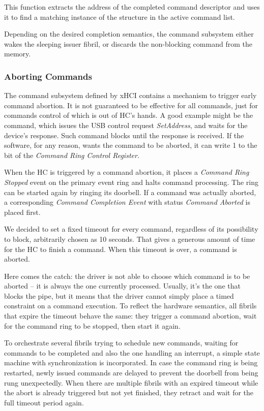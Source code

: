 This function extracts the address of the completed command descriptor and uses
it to find a matching instance of the  structure in the
active command list.

Depending on the desired completion semantics, the command subsystem either
wakes the sleeping issuer fibril, or discards the non-blocking command from the
memory.


\subsubsection{Aborting Commands}

The command subsystem defined by xHCI contains a mechanism to trigger early
command abortion. It is not guaranteed to be effective for all commands, just
for commands control of which is out of HC's hands. A good example might be the
 command, which issues the USB control request
\emph{SetAddress}, and waits for the device's response. Such command blocks
until the response is received. If the software, for any reason, wants the
command to be aborted, it can write 1 to the  bit of the
\emph{Command Ring Control Register}.

When the HC is triggered by a command abortion, it places a \emph{Command Ring
Stopped} event on the primary event ring and halts command processing. The ring
can be started again by ringing its doorbell. If a command was actually
aborted, a corresponding \emph{Command Completion Event} with status
\emph{Command Aborted} is placed first.

We decided to set a fixed timeout for every command, regardless of its
possibility to block, arbitrarily chosen as 10 seconds. That gives a generous
amount of time for the HC to finish a command. When this timeout is over,
a command is aborted.

Here comes the catch: the driver is not able to choose which command is to be
aborted -- it is always the one currently processed. Usually, it's the one that
blocks the pipe, but it means that the driver cannot simply place a timed
constraint on a command execution. To reflect the hardware semantics, all
fibrils that expire the timeout behave the same: they trigger a command
abortion, wait for the command ring to be stopped, then start it again.

To orchestrate several fibrils trying to schedule new commands, waiting for
commands to be completed and also the one handling an interrupt, a simple state
machine with synchronization is incorporated. In case the command ring is
being restarted, newly issued commands are delayed to prevent the doorbell from
being rung unexpectedly. When there are multiple fibrils with an expired timeout
while the abort is already triggered but not yet finished, they retract and
wait for the full timeout period again.

